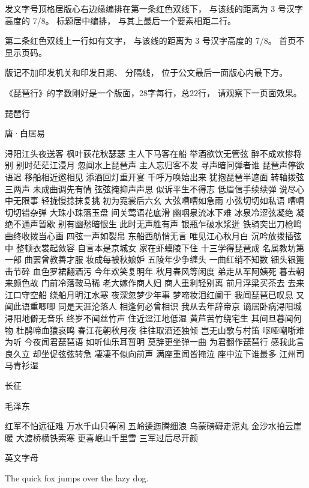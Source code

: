 \documentclass{article}
\begin{document}
发文字号顶格居版心右边缘编排在第一条红色双线下， 与该线的距离为 3 号汉字高度的 7/8。
标题居中编排， 与其上最后一个要素相距二行。

第二条红色双线上一行如有文字， 与该线的距离为 3 号汉字高度的 7/8。
首页不显示页码。

版记不加印发机关和印发日期、 分隔线， 位于公文最后一面版心内最下方。



\the\topskip
\vfill
《琵琶行》的字数刚好是一个版面，28字每行，总22行，
请观察下一页面效果。
\begin{center}
琵\quad 琶\quad 行

唐·白居易
\end{center}
\newpage
\noindent%
浔阳江头夜送客 枫叶荻花秋瑟瑟
主人下马客在船 举酒欲饮无管弦%
醉不成欢惨将别 别时茫茫江浸月
%
忽闻水上琵琶声 主人忘归客不发%
寻声暗问弹者谁 琵琶声停欲语迟
移船相近邀相见 添酒回灯重开宴%
千呼万唤始出来 犹抱琵琶半遮面
转轴拨弦三两声 未成曲调先有情%
弦弦掩抑声声思 似诉平生不得志
低眉信手续续弹 说尽心中无限事%
轻拢慢捻抹复挑 初为霓裳后六幺
大弦嘈嘈如急雨 小弦切切如私语%
嘈嘈切切错杂弹 大珠小珠落玉盘
间关莺语花底滑 幽咽泉流冰下难%
冰泉冷涩弦凝绝 凝绝不通声暂歇
别有幽愁暗恨生 此时无声胜有声%
银瓶乍破水浆迸 铁骑突出刀枪鸣
曲终收拨当心画 四弦一声如裂帛%
东船西舫悄无言 唯见江心秋月白
%
沉吟放拨插弦中 整顿衣裳起敛容%
自言本是京城女 家在虾蟆陵下住
十三学得琵琶成 名属教坊第一部%
曲罢曾教善才服 妆成每被秋娘妒
五陵年少争缠头 一曲红绡不知数%
钿头银篦击节碎 血色罗裙翻酒污
今年欢笑复明年 秋月春风等闲度%
弟走从军阿姨死 暮去朝来颜色故
门前冷落鞍马稀 老大嫁作商人妇%
商人重利轻别离 前月浮梁买茶去
去来江口守空船 绕船月明江水寒%
夜深忽梦少年事 梦啼妆泪红阑干
%
我闻琵琶已叹息 又闻此语重唧唧%
同是天涯沦落人 相逢何必曾相识
我从去年辞帝京 谪居卧病浔阳城%
浔阳地僻无音乐 终岁不闻丝竹声
住近湓江地低湿 黄芦苦竹绕宅生%
其间旦暮闻何物 杜鹃啼血猿哀鸣
春江花朝秋月夜 往往取酒还独倾%
岂无山歌与村笛 呕哑嘲哳难为听
今夜闻君琵琶语 如听仙乐耳暂明%
莫辞更坐弹一曲 为君翻作琵琶行
感我此言良久立 却坐促弦弦转急%
凄凄不似向前声 满座重闻皆掩泣
座中泣下谁最多 江州司马青衫湿%


\begin{center}
长\qquad\qquad 征

毛泽东

红军不怕远征难 万水千山只等闲
五岭逶迤腾细浪 乌蒙磅礴走泥丸
金沙水拍云崖暖 大渡桥横铁索寒
更喜岷山千里雪 三军过后尽开颜
  
\end{center}

\vfill
英文字母

The quick fox jumps over the lazy dog.
\end{document}
